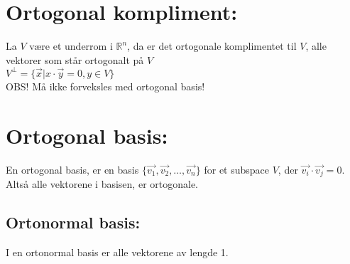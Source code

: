\documentclass[12pt,a4paper,twocolumn,twoside]{article}
\def\real{\mathbb{R}}
\begin{document}
\section*{Ortogonal kompliment:}
La $V$ være et underrom i $\real^n$, da er det ortogonale komplimentet til $V$, alle vektorer som står ortogonalt på $V$\\
$V^\perp=\{\vec{x}|x\cdot\vec{y} = 0, y\in V\}$\\
OBS! Må ikke forveksles med ortogonal basis!

\section*{Ortogonal basis:}
En ortogonal basis, er en basis $\{\vec{v_1},\vec{v_2},\dots,\vec{v_n}\}$ for et subspace $V$, der $\vec{v_i}\cdot\vec{v_j}=0$.
Altså alle vektorene i basisen, er ortogonale. 
\subsection*{Ortonormal basis:}
I en ortonormal basis er alle vektorene av lengde 1.
\end{document}
